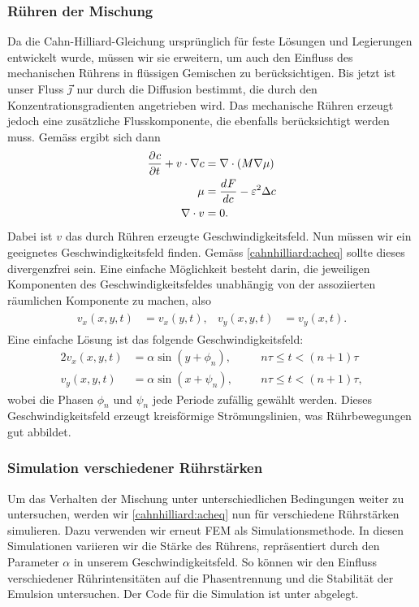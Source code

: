 \subsubsection{Rühren der Mischung}
Da die Cahn-Hilliard-Gleichung ursprünglich für feste Lösungen
und Legierungen entwickelt wurde,
müssen wir sie erweitern,
um auch den Einfluss des mechanischen Rührens in flüssigen Gemischen zu berücksichtigen.
Bis jetzt ist unser Fluss ${\vec{\jmath}}$ \;nur durch die Diffusion bestimmt,
die durch den Konzentrationsgradienten angetrieben wird.
Das mechanische Rühren erzeugt jedoch eine zusätzliche Flusskomponente,
die ebenfalls berücksichtigt werden muss.
Gemäss \cite{cahnhilliard:deriv-advective} ergibt sich dann
\begin{align}
\begin{aligned}
\frac{\partial^{} c}{\partial t^{}} + v \cdot \nabla c
&=
\nabla \cdot (M \nabla \mu)
\\
\mu
&=
\frac{d^{}{F}}{d{c^{}}} -  \varepsilon^2 \Delta c
\\
\nabla \cdot v
&=
0
.
\end{aligned}
\label{cahnhilliard:acheq}
\end{align}
Dabei ist $v$ das durch Rühren erzeugte Geschwindigkeitsfeld.
Nun müssen wir ein geeignetes Geschwindigkeitsfeld finden.
Gemäss \eqref{cahnhilliard:acheq} sollte dieses divergenzfrei sein.
Eine einfache Möglichkeit besteht darin,
die jeweiligen Komponenten des Geschwindigkeitsfeldes
unabhängig von der assoziierten räumlichen Komponente zu machen,
also
\begin{align*}
\begin{aligned}
v_x(x,y,t)
&=
v_x(y,t),
&
v_y(x,y,t)
&=
v_y(x,t)
.
\end{aligned}
\end{align*}
Eine einfache Lösung ist das folgende Geschwindigkeitsfeld:
\begin{alignat*}{2}
v_x(x, y, t)
&=
\alpha \sin(y + \phi_n)
,\quad&
& n \tau \leq t < (n+1) \tau
\\
v_y(x, y, t)
&=
\alpha \sin(x + \psi_n)
,&
& n \tau \leq t < (n+1) \tau
,
\end{alignat*}
wobei die Phasen $\phi_n$ und $\psi_n$ jede Periode zufällig gewählt werden.
Dieses Geschwindigkeitsfeld erzeugt kreisförmige Strömungslinien,
was Rührbewegungen gut abbildet.

\subsubsection{Simulation verschiedener Rührstärken}
Um das Verhalten der Mischung unter unterschiedlichen Bedingungen weiter zu untersuchen,
werden wir \eqref{cahnhilliard:acheq} nun für verschiedene Rührstärken simulieren.
Dazu verwenden wir erneut FEM als Simulationsmethode.
In diesen Simulationen variieren wir die Stärke des Rührens,
repräsentiert durch den Parameter $\alpha$ in unserem Geschwindigkeitsfeld.
So können wir den Einfluss verschiedener Rührintensitäten auf die Phasentrennung
und die Stabilität der Emulsion untersuchen.
Der Code für die Simulation ist unter \cite{cahnhilliard:repo} abgelegt.

